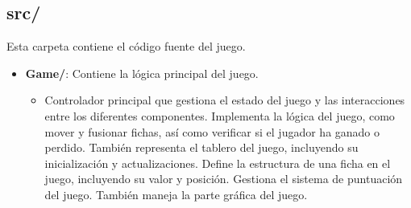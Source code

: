 \documentclass{article}
\begin{document}
\subsection{src/}
Esta carpeta contiene el código fuente del juego.
\begin{itemize}
    \item \textbf{Game/}: Contiene la lógica principal del juego.
    \begin{itemize}
        \item Controlador principal que gestiona el estado del juego y las interacciones entre los diferentes componentes.
        Implementa la lógica del juego, como mover y fusionar fichas, así como verificar si el jugador ha ganado o perdido.
        También representa el tablero del juego, incluyendo su inicialización y actualizaciones.
        Define la estructura de una ficha en el juego, incluyendo su valor y posición.
        Gestiona el sistema de puntuación del juego.
        También maneja la parte gráfica del juego.
    \end{itemize}
\end{itemize}
\end{document}
